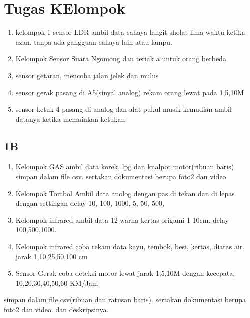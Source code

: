 \section{Tugas KElompok}

\begin{enumerate}
\item  kelompok 1 sensor LDR
ambil data cahaya langit sholat lima waktu ketika azan. tanpa ada gangguan cahaya lain atau lampu.

\item Kelompok Sensor Suara
Ngomong dan teriak a untuk orang berbeda

\item sensor getaran, mencoba jalan jelek dan mulus

\item sensor gerak
pasang di A5(sinyal analog) rekam orang lewat pada 1,5,10M


\item sensor ketuk 4
pasang di analog dan alat pukul musik kemudian ambil datanya ketika memainkan ketukan
\end{enumerate}


\subsection{1B}
\begin{enumerate}
\item Kelompok GAS
ambil data korek, lpg dan knalpot motor(ribuan baris) simpan dalam file csv. sertakan dokumentasi berupa foto2 dan video.

\item Kelompok Tombol
Ambil data anolog dengan pas di tekan dan di lepas dengan settingan delay 10, 100, 1000, 5, 50, 500,

\item Kelompok infrared
ambil data 12 warna kertas origami 1-10cm. delay 100,500,1000.

\item Kelompok infrared
coba rekam data kayu, tembok, besi, kertas, diatas air. jarak 1,10,25,50,100 cm 

\item Sensor Gerak
coba deteksi motor lewat jarak 1,5,10M dengan kecepata, 10,20,30,40,50,60 KM/Jam
\end{enumerate}

simpan dalam file csv(ribuan dan ratusan baris). sertakan dokumentasi berupa foto2 dan video. dan deskripsinya.